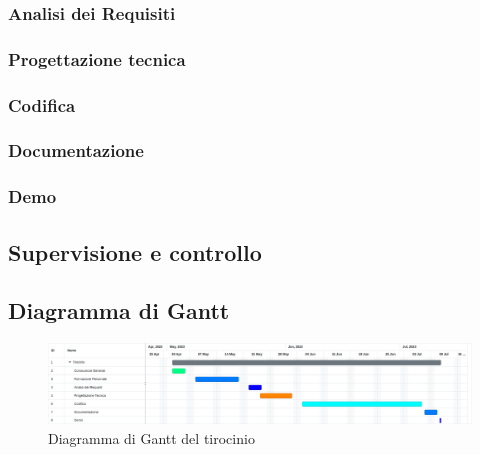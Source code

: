 \subsubsection{Analisi dei Requisiti}
\subsubsection{Progettazione tecnica}
\subsubsection{Codifica}
\subsubsection{Documentazione}
\subsubsection{Demo}

\subsection{Supervisione e controllo}

\subsection{Diagramma di Gantt}
\begin{figure}[!h] 
    \centering 
    \includegraphics[width=350pt]{images/diagrammaGantt.png} 
    \caption{Diagramma di Gantt del tirocinio}
\end{figure}
